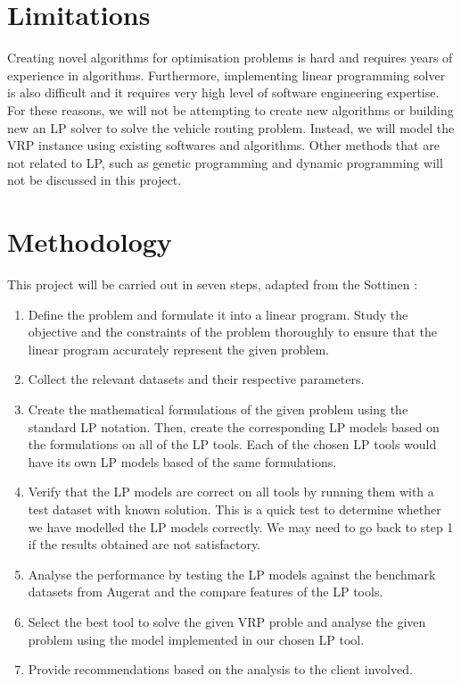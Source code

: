 \section{Limitations}
Creating novel algorithms for optimisation problems is hard and requires years of experience in algorithms. Furthermore,
implementing linear programming solver is also difficult and it requires very high level of software engineering expertise.
 For these reasons, we will not be attempting to create new algorithms or building new an LP solver to solve
the vehicle routing problem. Instead, we will model the VRP instance using existing softwares and algorithms.
Other methods that are not related to LP, such as genetic programming and dynamic programming will not be discussed in this project.

\section{Methodology}
This project will be carried out in seven steps, adapted from the Sottinen \cite{Sottinen2009}:
\begin{enumerate}
\item Define the problem and formulate it into a linear program. Study the objective and the constraints of the problem thoroughly to ensure
that the linear program accurately represent the given problem.
\item Collect the relevant datasets and their respective parameters.
\item Create the mathematical formulations of the given problem using the standard LP notation.
Then, create the corresponding LP models based on the formulations on all of the LP tools. Each of the chosen LP tools would
have its own LP models based of the same formulations.
\item Verify that the LP models are correct on all tools by running them with a test dataset with known solution. This is a quick test
to determine whether we have modelled the LP models correctly. We may need to go back to step 1 if the results obtained
are not satisfactory.
\item Analyse the performance by testing the LP models
 against the benchmark datasets from Augerat \cite{Augerat1998} and the compare features of the LP tools.
\item Select the best tool to solve the given VRP proble and analyse the given problem using the model implemented in our chosen LP tool.
\item Provide recommendations based on the analysis to the client involved.
\end{enumerate}

